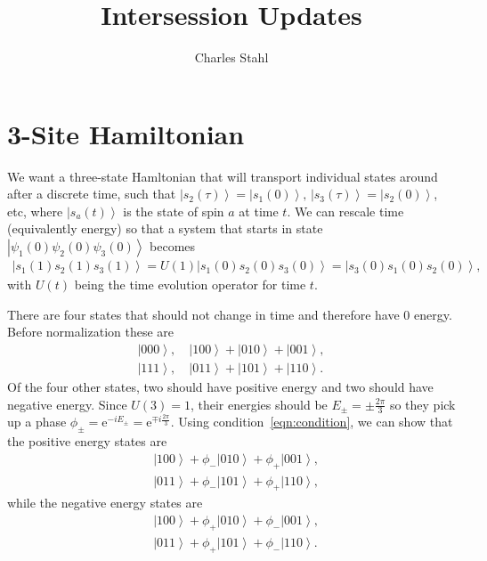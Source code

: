 \documentclass[11pt]{article}
\renewcommand{\t}{\tau}
\newcommand{\e}{\text{e}}
\newcommand{\ket}[1]{\left|#1\right\rangle}
\newcommand{\nn}{\nonumber\\}
\begin{document}
\title{Intersession Updates}
\author{Charles Stahl}

\maketitle

\section{3-Site Hamiltonian} \emph{}

We want a three-state Hamltonian that will transport individual states around after a discrete time, such that $\ket{s_2(\t)} = \ket{s_1(0)},\,\ket{s_3(\t)} = \ket{s_2(0)}$, etc, where $\ket{s_a(t)}$ is the state of spin $a$ at time $t$. We can rescale time (equivalently energy) so that a system that starts in state $\ket{\psi_1(0)\psi_2(0)\psi_3(0)}$ becomes
\begin{align}
\ket{s_1(1)s_2(1)s_3(1)} = U(1)\ket{s_1(0)s_2(0)s_3(0)} 
	= \ket{s_3(0)s_1(0)s_2(0)},\label{eqn:condition}
\end{align}
with $U(t)$ being the time evolution operator for time $t$.

There are four states that should not change in time and therefore have 0 energy. Before normalization these are
\begin{align}
\ket{000},\quad \ket{100}+\ket{010}+\ket{001},\nn
\ket{111},\quad \ket{011}+\ket{101}+\ket{110}.\label{eqn:zero}
\end{align}
Of the four other states, two should have positive energy and two should have negative energy. Since $U(3)=1$, their energies should be $E_\pm = \pm\frac{2\pi}{3}$ so they pick up a phase $\phi_\pm =\e^{-iE_\pm} = \e^{\mp i\frac{2\pi}{3}}$. Using condition~\ref{eqn:condition}, we can show that the positive energy states are
\begin{align}
&\ket{100} + \phi_-\ket{010} + \phi_+\ket{001},\nn
&\ket{011} + \phi_-\ket{101} + \phi_+\ket{110},\label{eqn:plus}
\end{align}
while the negative energy states are 
\begin{align}
&\ket{100} + \phi_+\ket{010} + \phi_-\ket{001},\nn
&\ket{011} + \phi_+\ket{101} + \phi_-\ket{110}.\label{eqn:minus}
\end{align}
\end{document}
